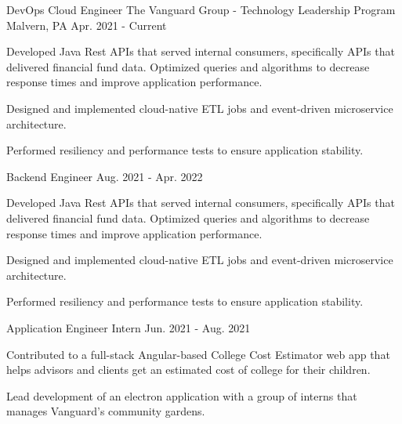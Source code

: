 

\begin{cventries}

  \cventry
    {DevOps Cloud Engineer} %
    {The Vanguard Group - Technology Leadership Program} %
    {Malvern, PA} %
    {Apr. 2021 - Current} %
    {
      \begin{cvitems} %
        \item {Developed Java Rest APIs that served internal consumers, specifically APIs that delivered financial fund data. Optimized queries and algorithms to decrease response times and improve application performance.}
        \item {Designed and implemented cloud-native ETL jobs and event-driven microservice architecture.}
        \item {Performed resiliency and performance tests to ensure application stability.}
      \end{cvitems}
    }
  \cventry
    {Backend Engineer} %
    {} %
    {} %
    {Aug. 2021 - Apr. 2022} %
    {
      \begin{cvitems} %
        \item {Developed Java Rest APIs that served internal consumers, specifically APIs that delivered financial fund data. Optimized queries and algorithms to decrease response times and improve application performance.}
        \item {Designed and implemented cloud-native ETL jobs and event-driven microservice architecture.}
        \item {Performed resiliency and performance tests to ensure application stability.}
      \end{cvitems}
    }

  \cventry
    {Application Engineer Intern} %
    {} %
    {} %
    {Jun. 2021 - Aug. 2021} %
    {
      \begin{cvitems} %
        \item {Contributed to a full-stack Angular-based College Cost Estimator web app that helps advisors and clients get an estimated cost of college for their children.}
        \item {Lead development of an electron application with a group of interns that manages Vanguard's community gardens.}
      \end{cvitems}
    }


\end{cventries}
